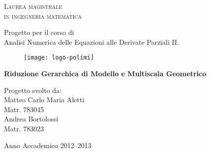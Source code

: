 \begin{titlepage}
\begin{center}
    { \scshape 
    Laurea magistrale\\
    in ingegneria matematica\\
    }
\end{center}
\vspace{1.2cm}
\begin{flushleft}
		\Large
		Progetto per il corso di \\
		Analisi Numerica delle Equazioni alle Derivate Parziali II.\\
		\vspace{1.5cm}
\end{flushleft}
\begin{figure}[h]
		\centering
		\texttt{[image: logo-polimi]}
		\vspace{1cm}
\end{figure}
\begin{center}
{ \bfseries  {\Large Riduzione Gerarchica di Modello e Multiscala Geometrico}\\
\vspace{0.2cm} }
\end{center}
\vspace{0.4cm}
\begin{flushright}
		\Large
		Progetto svolto da:\\
		Matteo Carlo Maria Aletti\\
		Matr. 783045\\
		Andrea Bortolossi\\
		Matr. 783023\\
		\vspace{1.5cm}
\end{flushright}
\begin{center}
Anno Accademico 2012--2013
\end{center}

\end{titlepage}